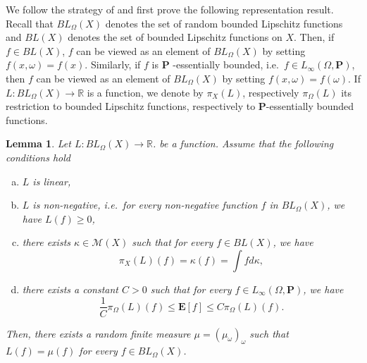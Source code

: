 \documentclass{amsart}
\newtheorem{lem}[thm]{Lemma}
\theoremstyle{definition}
\theoremstyle{remark}
\begin{document}
We follow the strategy of \cite[Theorem~4.4]{Crauel} and first prove the following representation result.
Recall that $BL_\Omega(X)$ denotes the set of random bounded Lipschitz functions and $BL(X)$ denotes the set of bounded Lipschitz functions on $X$.
Then, if $f\in BL(X)$, $f$ can be viewed as an element of $BL_\Omega(X)$ by setting $f(x,\omega)=f(x)$.
Similarly, if $f$ is $\mathbf P$ -essentially bounded, i.e.\ $f\in L_\infty(\Omega,\mathbf P)$, then $f$ can be viewed as an element of $BL_\Omega(X)$ by setting $f(x,\omega)=f(\omega)$.
If $L:BL_\Omega(X)\to \mathbb R$ is a function, we denote by $\pi_X(L)$, respectively $\pi_\Omega(L)$ its restriction to bounded Lipschitz functions, respectively to $\mathbf P$-essentially bounded functions.

\begin{lem}\label{StoneDaniell}
Let $L:BL_\Omega(X)\to \mathbb R$. be a function.
Assume that the following conditions hold
\begin{enumerate}[(a)]
    \item $L$ is linear,
    \item $L$ is non-negative, i.e.\ for every non-negative function $f$ in $BL_\Omega(X)$, we have $L(f)\geq 0$,
    \item there exists $\kappa\in \mathcal{M}(X)$ such that for every $f\in BL(X)$,
    we have
    $$\pi_X(L)(f)=\kappa(f)=\int fd\kappa,$$
    \item there exists a constant $C>0$ such that for every $f\in L_\infty(\Omega,\mathbf P)$, we have
    $$\frac{1}{C}\pi_\Omega(L)(f)\leq \mathbf E [f]\leq C\pi_\Omega(L)(f).$$
\end{enumerate}
Then, there exists a random finite measure $\mu=(\mu_\omega)_\omega$ such that $L(f)=\mu(f)$ for every $f\in BL_\Omega(X)$.
\end{lem}
\end{document}
